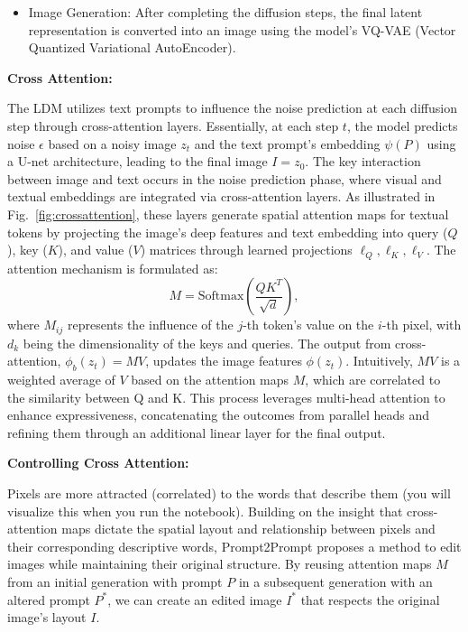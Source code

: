 \documentclass[11pt,addpoints,answers]{exam}
\begin{document}
\begin{questions}
\begin{itemize}
  \item Image Generation: After completing the diffusion steps, the final latent representation is converted into an image using the model's VQ-VAE (Vector Quantized Variational AutoEncoder).

\end{itemize}


\textbf{Cross Attention:} 

The LDM utilizes text prompts to influence the noise prediction at each diffusion step through cross-attention layers. Essentially, at each step $t$, the model predicts noise $\epsilon$ based on a noisy image $z_t$ and the text prompt's embedding $\psi(P)$ using a U-net architecture, leading to the final image $I = z_0$. The key interaction between image and text occurs in the noise prediction phase, where visual and textual embeddings are integrated via cross-attention layers. As illustrated in Fig.~\ref{fig:crossattention}, these layers generate spatial attention maps for textual tokens by projecting the image's deep features and text embedding into query ($Q$), key ($K$), and value ($V$) matrices through learned projections $\ell_Q, \ell_K, \ell_V$. The attention mechanism is formulated as:
\begin{equation}
M = \text{Softmax} \left( \frac{QK^T}{\sqrt{d}} \right),
\end{equation}
where $M_{ij}$ represents the influence of the $j$-th token's value on the $i$-th pixel, with $d_k$ being the dimensionality of the keys and queries. The output from cross-attention, $\phi_b(z_t) = MV$, updates the image features $\phi(z_t)$. Intuitively, $MV$ is a weighted average of $V$ based on the attention maps $M$, which are correlated to the similarity between Q and K. This process leverages multi-head attention to enhance expressiveness, concatenating the outcomes from parallel heads and refining them through an additional linear layer for the final output.

\textbf{Controlling Cross Attention:} 

Pixels are more attracted (correlated) to the words that describe them (you will visualize this when you run the notebook).
Building on the insight that cross-attention maps dictate the spatial layout and relationship between pixels and their corresponding descriptive words, Prompt2Prompt proposes a method to edit images while maintaining their original structure. By reusing attention maps $M$ from an initial generation with prompt $P$ in a subsequent generation with an altered prompt $P^*$, we can create an edited image $I^*$ that respects the original image's layout $I$.


\end{questions}
\end{document}
